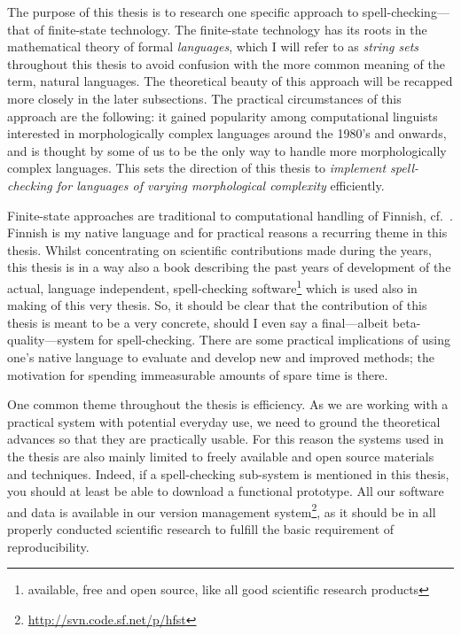 \documentclass[officiallayout]{unihelcompling}
\begin{document}
The purpose of this thesis is to research one specific approach to
spell-checking---that of finite-state technology. The finite-state technology
has its roots in the mathematical theory of formal \emph{languages}, which I
will refer to as \emph{string sets} throughout this thesis to avoid confusion
with the more common meaning of the term, natural languages. The theoretical
beauty of this approach will be recapped more closely in the later subsections.
The practical circumstances of this approach are the following: it gained
popularity among computational linguists interested in morphologically complex
languages around the 1980's and onwards, and is thought by some of us to be the
only way to handle more morphologically complex languages. This sets the
direction of this thesis to \emph{implement spell-checking for languages of
varying morphological complexity} efficiently.

Finite-state approaches are traditional to computational handling of Finnish,
cf.~\citet{koskenniemi1983twolevel}. Finnish is my native language and for
practical reasons a recurring theme in this thesis. Whilst concentrating on
scientific contributions made during the years, this thesis is in a way also a
book describing the past years of development of the actual, language
independent, spell-checking software\footnote{available, free and open source,
like all good scientific research products} which is used also in making of
this very thesis. So, it should be clear that the contribution of this thesis
is meant to be a very concrete, should I even say a final---albeit
beta-quality---system for spell-checking.  There are some practical
implications of using one's native language to evaluate and develop new and
improved methods; the motivation for spending immeasurable amounts of spare
time is there.

One common theme throughout the thesis is efficiency. As we are working with a
practical system with potential everyday use, we need to ground the theoretical
advances so that they are practically usable. For this reason the systems used
in the thesis are also mainly limited to freely available and open source
materials and techniques. Indeed, if a spell-checking sub-system is mentioned
in this thesis, you should at least be able to download a functional prototype.
All our software and data is available in our version management
system\footnote{\url{http://svn.code.sf.net/p/hfst}}, as it should be in all
properly conducted scientific research to fulfill the basic requirement of
reproducibility.
\end{document}
